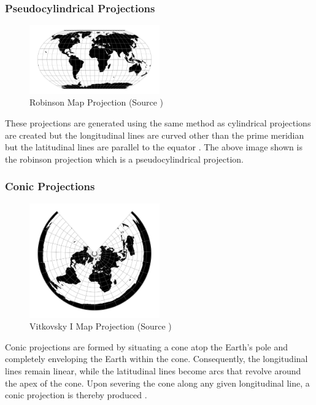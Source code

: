 \subsubsection{Pseudocylindrical Projections}

\begin{figure}[h]
    \centering
    \includegraphics[width=0.5\textwidth]{figures/chapter-1/robinson.png}
    \caption{Robinson Map Projection (Source \cite{PROJ_SITE})}
    \label{fig:robinson-image}
\end{figure}


These projections are generated using the same method as cylindrical projections are created but the longitudinal lines are curved other than the prime meridian but the latitudinal lines are parallel to the equator \cite{GISGEO_Cylinder}.
The above image shown is the robinson projection which is a pseudocylindrical projection.

\subsubsection{Conic Projections}

\begin{figure}[h]
    \centering
    \includegraphics[width=0.5\textwidth]{figures/chapter-3/vitk1.png}
    \caption{Vitkovsky I Map Projection (Source \cite{PROJ_SITE})}
    \label{fig:vitkovsky-image}
\end{figure}
Conic projections are formed by situating a cone atop the Earth's pole and completely enveloping the Earth within the cone. Consequently, the longitudinal lines remain linear, while the latitudinal lines become arcs that revolve around the apex of the cone. Upon severing the cone along any given longitudinal line, a conic projection is thereby produced \cite{Snyder1982}.

